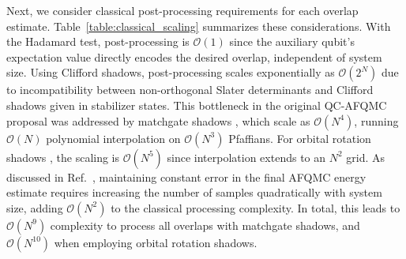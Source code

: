 \documentclass[../main.tex]{subfiles}
\begin{document}
Next, we consider classical post-processing requirements for each overlap estimate. Table~\ref{table:classical_scaling} summarizes these considerations. With the Hadamard test, post-processing is $\mathcal{O}(1)$ since the auxiliary qubit's expectation value directly encodes the desired overlap, independent of system size.
Using Clifford shadows, post-processing scales exponentially as $\mathcal{O}(2^N)$ due to incompatibility between non-orthogonal Slater determinants and Clifford shadows given in stabilizer states. This bottleneck in the original QC-AFQMC proposal \cite{huggins2022unbiasing} was addressed by matchgate shadows \cite{wan2022matchgate}, which scale as $\mathcal{O}(N^4)$, running $\mathcal{O}(N)$ polynomial interpolation on $\mathcal{O}(N^3)$ Pfaffians. For orbital rotation shadows \cite{low2022classical}, the scaling is $\mathcal{O}(N^5)$ since interpolation extends to an $N^2$ grid.
As discussed in Ref.~\cite{lee2022twenty}, maintaining constant error in the final AFQMC energy estimate requires increasing the number of samples quadratically with system size, adding $\mathcal{O}(N^2)$ to the classical processing complexity. In total, this leads to $\mathcal{O}(N^9)$ complexity to process all overlaps with matchgate shadows, and $\mathcal{O}(N^{10})$ when employing orbital rotation shadows.
\end{document}
